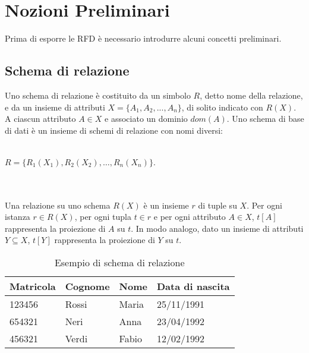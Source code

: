 \section{Nozioni Preliminari}
Prima di esporre le RFD è necessario introdurre alcuni concetti preliminari.

\subsection{Schema di relazione}
Uno schema di relazione è costituito da un simbolo $R$, detto nome della relazione, e da un insieme di attributi $X = \{A_1,A_2,...,A_n\}$, di solito indicato
con $R(X)$. A ciascun attributo $A \in X$ e associato un dominio $dom(A)$.
Uno schema di base di dati è un insieme di schemi di relazione con nomi
diversi:
\\~\\
\centerline{$R = \{ R_1(X_1),R_2(X_2),\ldots,R_n(X_n)\}$.}
\\~\\
Una relazione su uno schema $R(X)$ è un insieme $r$ di tuple su $X$. Per
ogni istanza $r \in R(X)$, per ogni tupla $t \in r$ e per ogni attributo $A \in X$,
$t[A]$ rappresenta la proiezione di $A$ su $t$. In modo analogo, dato un insieme
di attributi $Y \subseteq X$, $t[Y]$ rappresenta la proiezione di $Y$ su $t$.\cite{libroCeri}


\begin{table}[H]
    \centering
    \begin{tabular}{ | l | l | l | l |}
        \hline
        Matricola & Cognome & Nome & Data di nascita\\
        \hline
        123456 & Rossi & Maria & 25/11/1991 \\ 
        654321 & Neri & Anna & 23/04/1992 \\ 
        456321 & Verdi & Fabio & 12/02/1992 \\
        \hline
    \end{tabular}
    \caption{Esempio di schema di relazione}
    \label{tab:table example}
\end{table}

